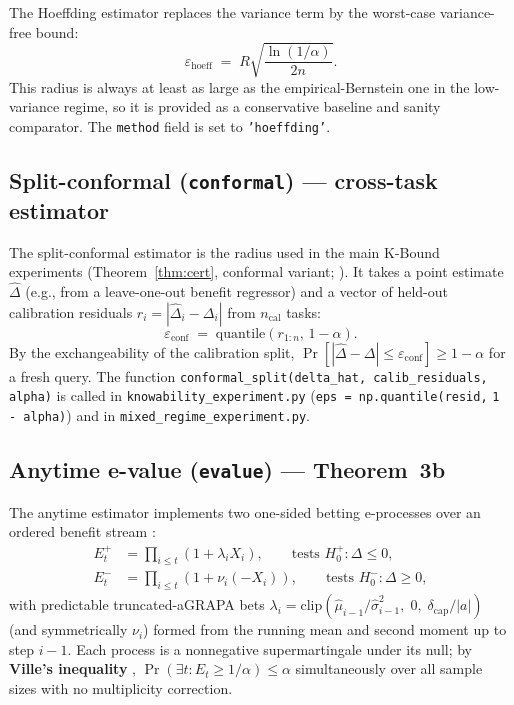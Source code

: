 The Hoeffding estimator replaces the variance term by the worst-case
variance-free bound:
\begin{equation}
  \varepsilon_{\mathrm{hoeff}} \;=\; R \sqrt{\frac{\ln(1/\alpha)}{2n}}.
  \label{eq:hoeff}
\end{equation}
This radius is always at least as large as the empirical-Bernstein one in the
low-variance regime, so it is provided as a conservative baseline and sanity
comparator.  The \texttt{method} field is set to \texttt{'hoeffding'}.

\subsection{Split-conformal (\texttt{conformal}) --- cross-task estimator}
\label{sec:kga-conformal}

The split-conformal estimator is the radius used in the main K-Bound experiments
(Theorem~\ref{thm:cert}, conformal variant; \cite{vovk2005algorithmic,
angelopoulos2023conformal}).  It takes a point estimate $\widehat\Delta$ (e.g.,
from a leave-one-out benefit regressor) and a vector of held-out calibration
residuals $r_i = |\widehat\Delta_i - \Delta_i|$ from $n_\mathrm{cal}$ tasks:
\begin{equation}
  \varepsilon_{\mathrm{conf}} \;=\; \mathrm{quantile}\!\left(r_{1:n},\, 1 -
  \alpha\right).
  \label{eq:conformal}
\end{equation}
By the exchangeability of the calibration split, $\Pr[|\widehat\Delta -
\Delta| \leq \varepsilon_{\mathrm{conf}}] \geq 1 - \alpha$ for a fresh query.
The function \texttt{conformal\_split(delta\_hat, calib\_residuals, alpha)} is
called in \texttt{knowability\_experiment.py} (\texttt{eps = np.quantile(resid,}
\texttt{1 - alpha)}) and in \texttt{mixed\_regime\_experiment.py}.

\subsection{Anytime e-value (\texttt{evalue}) --- Theorem~3b}
\label{sec:kga-evalue}

The anytime estimator implements two one-sided betting e-processes over an
ordered benefit stream \cite{ville1939etude,waudbysmith2024betting}:
\begin{align}
  E_t^+ &= \prod_{i \leq t} (1 + \lambda_i X_i), \qquad
  \text{tests } H_0^+: \Delta \leq 0,
  \label{eq:eplus}\\
  E_t^- &= \prod_{i \leq t} (1 + \nu_i(-X_i)), \qquad
  \text{tests } H_0^-: \Delta \geq 0,
  \label{eq:eminus}
\end{align}
with predictable truncated-aGRAPA bets
$\lambda_i = \mathrm{clip}(\widehat\mu_{i-1}/\widehat\sigma^2_{i-1},\;0,\;
\delta_{\mathrm{cap}}/|a|)$ (and symmetrically $\nu_i$) formed from
the running mean and second moment up to step $i-1$.  Each process is a
nonnegative supermartingale under its null; by \textbf{Ville's inequality}
\cite{ville1939etude}, $\Pr(\exists t: E_t \geq 1/\alpha) \leq \alpha$
simultaneously over all sample sizes with no multiplicity correction.

